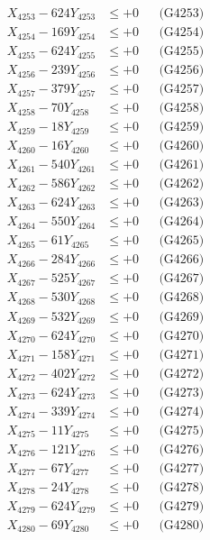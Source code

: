 \documentclass[a4paper,10pt]{article}
\begin{document}
{\begin{align}
X_{4253} - 624Y_{4253} &\leq +0 && \text{(G4253)} \\
X_{4254} - 169Y_{4254} &\leq +0 && \text{(G4254)} \\
X_{4255} - 624Y_{4255} &\leq +0 && \text{(G4255)} \\
X_{4256} - 239Y_{4256} &\leq +0 && \text{(G4256)} \\
X_{4257} - 379Y_{4257} &\leq +0 && \text{(G4257)} \\
X_{4258} - 70Y_{4258} &\leq +0 && \text{(G4258)} \\
X_{4259} - 18Y_{4259} &\leq +0 && \text{(G4259)} \\
X_{4260} - 16Y_{4260} &\leq +0 && \text{(G4260)} \\
\allowbreak
X_{4261} - 540Y_{4261} &\leq +0 && \text{(G4261)} \\
X_{4262} - 586Y_{4262} &\leq +0 && \text{(G4262)} \\
X_{4263} - 624Y_{4263} &\leq +0 && \text{(G4263)} \\
X_{4264} - 550Y_{4264} &\leq +0 && \text{(G4264)} \\
X_{4265} - 61Y_{4265} &\leq +0 && \text{(G4265)} \\
X_{4266} - 284Y_{4266} &\leq +0 && \text{(G4266)} \\
X_{4267} - 525Y_{4267} &\leq +0 && \text{(G4267)} \\
X_{4268} - 530Y_{4268} &\leq +0 && \text{(G4268)} \\
X_{4269} - 532Y_{4269} &\leq +0 && \text{(G4269)} \\
X_{4270} - 624Y_{4270} &\leq +0 && \text{(G4270)} \\
\allowbreak
X_{4271} - 158Y_{4271} &\leq +0 && \text{(G4271)} \\
X_{4272} - 402Y_{4272} &\leq +0 && \text{(G4272)} \\
X_{4273} - 624Y_{4273} &\leq +0 && \text{(G4273)} \\
X_{4274} - 339Y_{4274} &\leq +0 && \text{(G4274)} \\
X_{4275} - 11Y_{4275} &\leq +0 && \text{(G4275)} \\
X_{4276} - 121Y_{4276} &\leq +0 && \text{(G4276)} \\
X_{4277} - 67Y_{4277} &\leq +0 && \text{(G4277)} \\
X_{4278} - 24Y_{4278} &\leq +0 && \text{(G4278)} \\
X_{4279} - 624Y_{4279} &\leq +0 && \text{(G4279)} \\
X_{4280} - 69Y_{4280} &\leq +0 && \text{(G4280)} \\

\end{align}}
\end{document}
